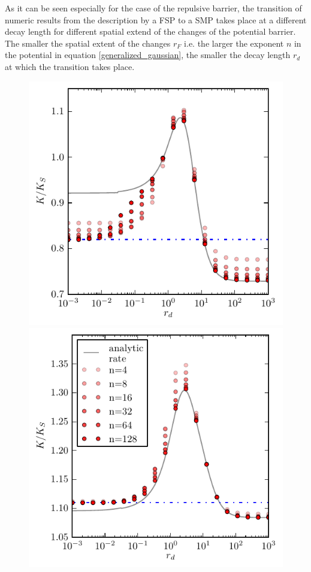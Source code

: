   As it can be seen especially for the case of the repulsive barrier, the transition of numeric results from the description by a FSP to a SMP takes place at a different decay length for different spatial extend of the changes of the potential barrier.  The smaller the spatial extent of the changes $r_F$ i.e. the larger the exponent $n$ in the potential in equation \eqref{generalized_gaussian}, the smaller the decay length $r_d$ at which the transition takes place. \\


\begin{minipage}[t]{.63 \textwidth}
     \begin{figure}[H]
        \hspace{-1cm } \includegraphics[width = 1 \textwidth]{plots/rb_cs.pdf} \\
        \hspace{-1cm } \includegraphics[width = 1 \textwidth]{plots/ab_cs.pdf} \\

\end{figure}
\end{minipage}

